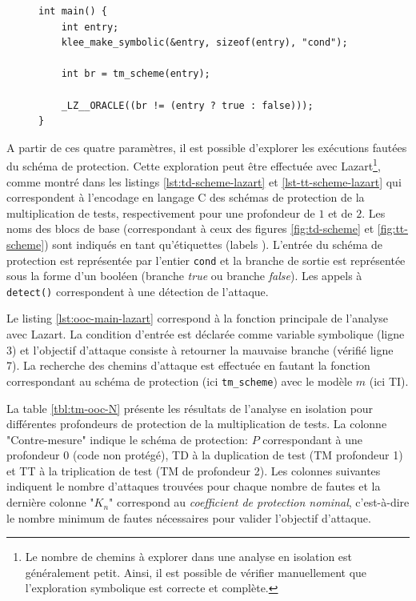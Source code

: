 \begin{figure}[p]\centering
{}
\begin{lstlisting}
int main() {
    int entry;
    klee_make_symbolic(&entry, sizeof(entry), "cond");

    int br = tm_scheme(entry);

    _LZ__ORACLE((br != (entry ? true : false)));
}
\end{lstlisting}
            \end{figure}
        
                A partir de ces quatre paramètres, il est possible d'explorer les exécutions fautées du schéma de protection. Cette exploration peut être effectuée avec Lazart\footnote{Le nombre de chemins à explorer dans une analyse en isolation est généralement petit. Ainsi, il est possible de vérifier manuellement que l'exploration symbolique est correcte et complète.}, comme montré dans les listings \ref{lst:td-scheme-lazart} et \ref{lst-tt-scheme-lazart} qui correspondent à l'encodage en langage C des schémas de protection de la multiplication de tests, respectivement pour une profondeur de $1$ et de $2$.
                Les noms des blocs de base (correspondant à ceux des figures \ref{fig:td-scheme} et \ref{fig:tt-scheme}) sont indiqués en tant qu'étiquettes (labels ).
                L'entrée du schéma de protection est représentée par l'entier \texttt{cond} et la branche de sortie est représentée sous la forme d'un booléen (branche \textit{true} ou branche \textit{false}).
                Les appels à \texttt{detect()} correspondent à une détection de l'attaque.
        
                Le listing  \ref{lst:ooc-main-lazart} correspond à la fonction principale de l'analyse avec Lazart.
                La condition d'entrée est déclarée comme variable symbolique (ligne 3) et l'objectif d'attaque consiste à retourner la mauvaise branche (vérifié ligne 7).
                La recherche des chemins d'attaque est effectuée en fautant la fonction correspondant au schéma de protection (ici \texttt{tm\_scheme}) avec le modèle $m$ (ici \gls{TI}).

                La table \ref{tbl:tm-ooc-N} présente les résultats de l'analyse en isolation pour différentes profondeurs de protection de la multiplication de tests.
                La colonne "Contre-mesure" indique le schéma de protection: $P$ correspondant à une profondeur 0 (code non protégé), \gls{TD} à la duplication de test (\gls{TM} profondeur 1) et \gls{TT} à la triplication de test (\gls{TM} de profondeur 2).
                Les colonnes suivantes indiquent le nombre d'attaques trouvées pour chaque nombre de fautes et la dernière colonne "$K_n$" correspond au \textit{coefficient de protection nominal}, c'est-à-dire le nombre minimum de fautes nécessaires pour valider l'objectif d'attaque.
    

